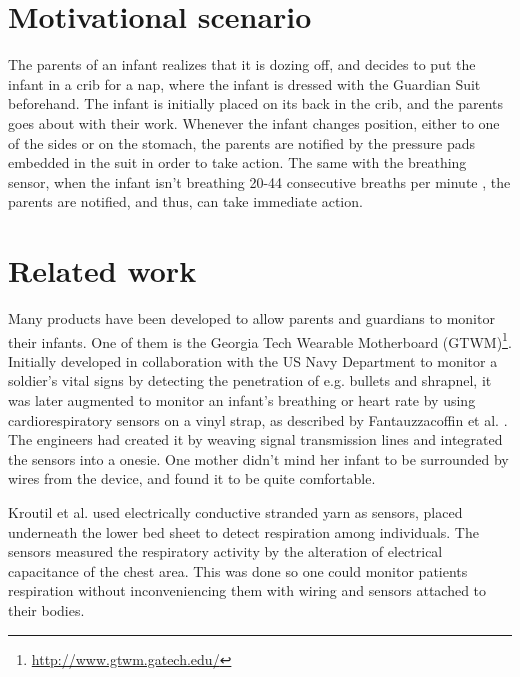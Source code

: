 \documentclass{sigchi-ext}
\begin{document}

\section{Motivational scenario}
The parents of an infant realizes that it is dozing off, and decides to put the infant in a crib for a nap, where the infant is dressed with the Guardian Suit beforehand. The infant is initially placed on its back in the crib, and the parents goes about with their work. Whenever the infant changes position, either to one of the sides or on the stomach, the parents are notified by the pressure pads embedded in the suit in order to take action. The same with the breathing sensor, when the infant isn't breathing 20-44 consecutive breaths per minute \cite{a18-huang}, the parents are notified, and thus, can take immediate action.

\section{Related work}
Many products have been developed to allow parents and guardians to monitor their infants. One of them is the Georgia Tech Wearable Motherboard (GTWM)\footnote{\url{http://www.gtwm.gatech.edu/}}. Initially developed in collaboration with the US Navy Department to monitor a soldier's vital signs by detecting the penetration of e.g. bullets and shrapnel, it was later augmented to monitor an infant's breathing or heart rate by using cardiorespiratory sensors on a vinyl strap, as described by Fantauzzacoffin et al. \cite{p285-fantauzzacoffin}. The engineers had created it by weaving signal transmission lines and integrated the sensors into a onesie. One mother didn't mind her infant to be surrounded by wires from the device, and found it to be quite comfortable.

Kroutil et al. \cite{a33-kroutil} used electrically conductive stranded yarn as sensors, placed underneath the lower bed sheet to detect respiration among individuals. The sensors measured the respiratory activity by the alteration of electrical capacitance of the chest area. This was done so one could monitor patients respiration without inconveniencing them with wiring and sensors attached to their bodies.
\end{document}
